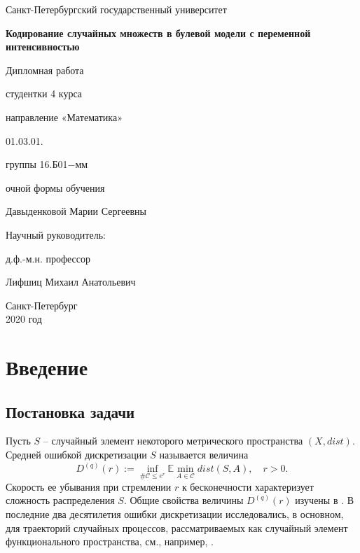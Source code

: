 \documentclass[12pt]{article}
\theoremstyle{plain}
\theoremstyle{definition}
\theoremstyle{remark}
\def\leq{\leqslant}
\newcommand{\E}{\mathbb{E}}
\begin{document}
\thispagestyle{empty}%

\centerline{\large Санкт-Петербургский государственный университет}

\vspace{5.5cm}

\begin{center}
{\bf\LARGE Кодирование случайных множеств в булевой модели с переменной интенсивностью}
\end{center}

\vspace{1.3cm}

{\parindent=9.2cm \large
	Дипломная работа \par
	студентки 4 курса \par
	направление «Математика» \par
	01.03.01.\par 
	группы 16.Б01$-$мм\par
	очной формы обучения \par
	Давыденковой Марии Сергеевны \par}

\vspace{1.1cm}

{\parindent=9.2cm \large
	Научный руководитель: \par
	д.ф.-м.н. профессор \par
	Лифшиц Михаил Анатольевич \par}

\vspace{4.0cm}
\begin{center}
	\large
	Санкт-Петербург \\
	2020 год
\end{center}

\tableofcontents

\section{Введение}
\subsection{Постановка задачи}

Пусть $S$  --  случайный элемент некоторого метрического пространства $(X, dist)$.
Средней ошибкой дискретизации $S$ называется величина  $$D^{(q)}(r) := \inf\limits_{\#\mathcal{C}\leq e^r}\E \min\limits_{A\in\mathcal{C}}dist(S, A), \quad r>0.$$ 
Скорость ее убывания при  стремлении $r$ к бесконечности характеризует сложность распределения $S$. 
Общие свойства величины $D^{(q)}(r)$ изучены в \cite{GL, CT, Kolm}.
В последние два десятилетия ошибки дискретизации исследовались, в основном,
для траекторий случайных процессов, рассматриваемых как случайный элемент функционального пространства, см., например, \cite{ADSV, Der}. 
\end{document}
